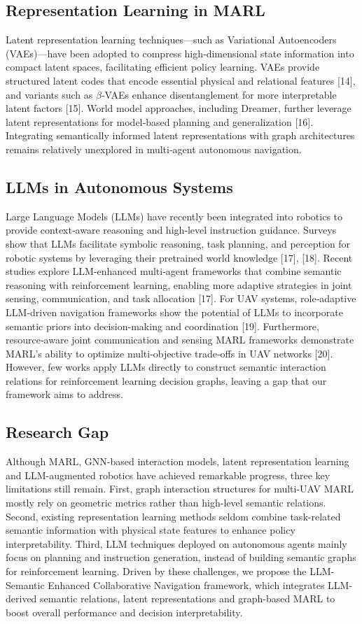 \documentclass[conference]{IEEEtran}
\begin{document}
\subsection{Representation Learning in MARL}
Latent representation learning techniques—such as Variational Autoencoders (VAEs)—have been adopted to compress high‑dimensional state information into compact latent spaces, facilitating efficient policy learning. VAEs provide structured latent codes that encode essential physical and relational features [14], and variants such as $\beta$‑VAEs enhance disentanglement for more interpretable latent factors [15]. World model approaches, including Dreamer, further leverage latent representations for model‑based planning and generalization [16]. Integrating semantically informed latent representations with graph architectures remains relatively unexplored in multi‑agent autonomous navigation.

\subsection{LLMs in Autonomous Systems}
Large Language Models (LLMs) have recently been integrated into robotics to provide context‑aware reasoning and high‑level instruction guidance. Surveys show that LLMs facilitate symbolic reasoning, task planning, and perception for robotic systems by leveraging their pretrained world knowledge [17], [18]. Recent studies explore LLM‑enhanced multi‑agent frameworks that combine semantic reasoning with reinforcement learning, enabling more adaptive strategies in joint sensing, communication, and task allocation [17]. For UAV systems, role‑adaptive LLM‑driven navigation frameworks show the potential of LLMs to incorporate semantic priors into decision‑making and coordination [19]. Furthermore, resource‑aware joint communication and sensing MARL frameworks demonstrate MARL’s ability to optimize multi‑objective trade‑offs in UAV networks [20]. However, few works apply LLMs directly to construct semantic interaction relations for reinforcement learning decision graphs, leaving a gap that our framework aims to address.

\subsection{Research Gap}
Although MARL, GNN-based interaction models, latent representation learning and LLM-augmented robotics have achieved remarkable progress, three key limitations still remain. First, graph interaction structures for multi-UAV MARL mostly rely on geometric metrics rather than high-level semantic relations. Second, existing representation learning methods seldom combine task-related semantic information with physical state features to enhance policy interpretability. Third, LLM techniques deployed on autonomous agents mainly focus on planning and instruction generation, instead of building semantic graphs for reinforcement learning. Driven by these challenges, we propose the LLM-Semantic Enhanced Collaborative Navigation framework, which integrates LLM-derived semantic relations, latent representations and graph-based MARL to boost overall performance and decision interpretability.
\end{document}
